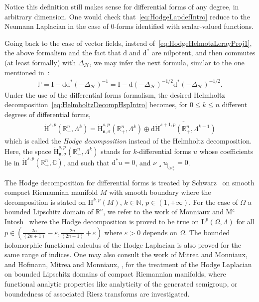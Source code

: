 \documentclass[AHL,Unicode,longabstracts,published]{cedram}
\newcommand{\bbP}{\mathbb{P}}
\newcommand{\bbR}{\mathbb{R}}
\newcommand{\bbC}{\mathbb{C}}
\newcommand{\bbN}{\mathbb{N}}
\newcommand{\rmH}{\mathrm{H}}%
\newcommand{\rmd}{\mathrm{d}}
\newcommand{\rmL}{\mathrm{L}}
\newcommand{\rmI}{\mathrm{I}}
\newcommand{\clH}{\mathcal{H}}
\newcommand{\fkn}{\mathfrak{n}}
\newcommand{\iprod}{\mathbin{\lrcorner}}
\begin{document}
Notice this definition still makes sense for differential forms of any degree, in arbitrary dimension. One would check that~\eqref{eq:HodgeLapdefIntro} reduce to the Neumann Laplacian in the case of $0$-forms identified with scalar-valued functions.

Going back to the case of vector fields, instead of~\eqref{eq:HodgeHelmotzLerayProj1}, the above formalism and the fact that $\rmd$ and 
$\rmd^\ast$ are nilpotent, and then commutes (at least formally) with $\Delta_{\clH}$, we may infer the next formula, similar to the one mentioned in~\cite[Section~5]{AuscherCouhlonDuongHofmann2004}:
\begin{align}\label{eq:HodgeHelmotzLerayProj2}
\bbP = \rmI  -\rmd\rmd^\ast(-\Delta_{\clH})^{-1} = \rmI  -\rmd 
(-\Delta_{\clH})^{-1/2}\rmd^\ast(-\Delta_{\clH})^{-1/2} .
\end{align}
Under the use of the differential forms formalism, the desired Helmholtz decomposition~\eqref{eq:HelmholtzDecompHspIntro} becomes, for $0\leqslant k\leqslant n$ different degrees of differential forms,
\begin{align}\label{eq:HodgeDecompHspIntro}
\dot{\rmH}^{s,p}\left(\bbR^n_+,\Lambda^{k}\right) = \dot{\rmH}^{s,p}_{\fkn,\sigma}\left(\bbR^n_+,\Lambda^{k}\right) \oplus \overline{\rmd \dot{\rmH}^{s+1,p}\left(\bbR^n_+,\Lambda^{k-1}\right)}
\end{align}
which is called the \emph{Hodge decomposition} instead of the Helmholtz decomposition. Here, the space $\dot{\rmH}^{s,p}_{\fkn,\sigma}(\bbR^n_+,\Lambda^{k})$ stands for $k$-differential forms $u$ whose coefficients lie in $\dot{\rmH}^{s,p}(\bbR^n_+,\bbC)$, and such that $\rmd^{\ast} u =0$, and $\nu
\iprod u_{|_{\partial \bbR^n_+}} =0$.

The Hodge decomposition for differential forms is treated by Schwarz~\cite[Theorem~2.4.2, Theorem~2.4.14]{Schwartz1995} on smooth compact Riemannian manifold $M$ with smooth boundary where the decomposition is stated on $\rmH^{k,p}(M)$, $k\in\bbN $, $p\in(1,+\infty)$. For the case of $\Omega$ a bounded Lipschitz domain of $\bbR^n$, we refer to the work of Monniaux and 
M${}^{\text{c}}$Intosh~\cite[Theorem~4.3,~Theorem~7.1]{McintoshMonniaux2018} where the Hodge decomposition is proved to be true on $\rmL^p(\Omega,\Lambda)$ for all $p\in(\tfrac{2n}{(2n+1)}-\varepsilon,\tfrac{2n}{(2n-1)}+\varepsilon)$ where $\varepsilon>0$ depends on $\Omega$. The bounded holomorphic functional calculus of the Hodge Laplacian is also proved for the same range of indices. One may also consult the work of Mitrea and Monniaux, and Hofmann, Mitrea and Monniaux, \cite{MitreaMonniaux2009-2,HofmannMitreaMonniaux2011}, for the treatment of the Hodge Laplacian on bounded Lipschitz domains of compact Riemannian manifolds, where functional analytic properties like analyticity of the generated semigroup, or boundedness of associated Riesz transforms are investigated.
\end{document}
